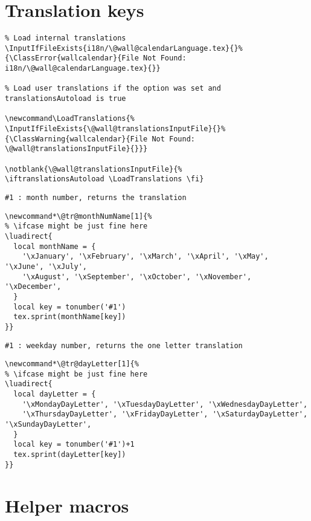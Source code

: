 \documentclass[11pt,oneside]{memoir-article}
\begin{document}
\chapter{Translation keys}
\label{sec-12}

\begin{verbatim}
% Load internal translations
\InputIfFileExists{i18n/\@wall@calendarLanguage.tex}{}%
{\ClassError{wallcalendar}{File Not Found: i18n/\@wall@calendarLanguage.tex}{}}

% Load user translations if the option was set and translationsAutoload is true

\newcommand\LoadTranslations{%
\InputIfFileExists{\@wall@translationsInputFile}{}%
{\ClassWarning{wallcalendar}{File Not Found: \@wall@translationsInputFile}{}}}

\notblank{\@wall@translationsInputFile}{%
\iftranslationsAutoload \LoadTranslations \fi}
\end{verbatim}

\begin{verbatim}
#1 : month number, returns the translation
\end{verbatim}

\begin{verbatim}
\newcommand*\@tr@monthNumName[1]{%
% \ifcase might be just fine here
\luadirect{
  local monthName = {
    '\xJanuary', '\xFebruary', '\xMarch', '\xApril', '\xMay', '\xJune', '\xJuly',
    '\xAugust', '\xSeptember', '\xOctober', '\xNovember', '\xDecember',
  }
  local key = tonumber('#1')
  tex.sprint(monthName[key])
}}
\end{verbatim}

\begin{verbatim}
#1 : weekday number, returns the one letter translation 
\end{verbatim}

\begin{verbatim}
\newcommand*\@tr@dayLetter[1]{%
% \ifcase might be just fine here
\luadirect{
  local dayLetter = {
    '\xMondayDayLetter', '\xTuesdayDayLetter', '\xWednesdayDayLetter',
    '\xThursdayDayLetter', '\xFridayDayLetter', '\xSaturdayDayLetter', '\xSundayDayLetter',
  }
  local key = tonumber('#1')+1
  tex.sprint(dayLetter[key])
}}
\end{verbatim}

\chapter{Helper macros}
\label{sec-13}
\end{document}
